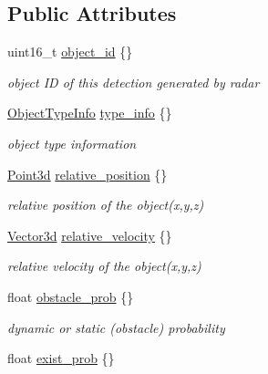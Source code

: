 \subsection*{Public Attributes}
\begin{DoxyCompactItemize}
\item 
uint16\+\_\+t \hyperlink{structmaf__perception__interface_1_1BoschRadarPerceptionObjectData_ad34be21fb3f7c00e1fc17e7fe871b0e0}{object\+\_\+id} \{\}
\begin{DoxyCompactList}\small\item\em object ID of this detection generated by radar \end{DoxyCompactList}\item 
\hyperlink{structmaf__perception__interface_1_1ObjectTypeInfo}{Object\+Type\+Info} \hyperlink{structmaf__perception__interface_1_1BoschRadarPerceptionObjectData_a231e587b1d938f9cfda399599fdfa936}{type\+\_\+info} \{\}
\begin{DoxyCompactList}\small\item\em object type information \end{DoxyCompactList}\item 
\hyperlink{structmaf__perception__interface_1_1Point3d}{Point3d} \hyperlink{structmaf__perception__interface_1_1BoschRadarPerceptionObjectData_a7279a4e4382fdb057f93a926fdc738c0}{relative\+\_\+position} \{\}
\begin{DoxyCompactList}\small\item\em relative position of the object(x,y,z) \end{DoxyCompactList}\item 
\hyperlink{structmaf__perception__interface_1_1Vector3d}{Vector3d} \hyperlink{structmaf__perception__interface_1_1BoschRadarPerceptionObjectData_aa4d8e42a25522defd103884a79426f76}{relative\+\_\+velocity} \{\}
\begin{DoxyCompactList}\small\item\em relative velocity of the object(x,y,z) \end{DoxyCompactList}\item 
float \hyperlink{structmaf__perception__interface_1_1BoschRadarPerceptionObjectData_a634481f98787699248f19a5d02bd29d8}{obstacle\+\_\+prob} \{\}
\begin{DoxyCompactList}\small\item\em dynamic or static (obstacle) probability \end{DoxyCompactList}\item 
float \hyperlink{structmaf__perception__interface_1_1BoschRadarPerceptionObjectData_adc5eb28d6a0eddb331e11ed3dcfa3c34}{exist\+\_\+prob} \{\}

\end{DoxyCompactItemize}
